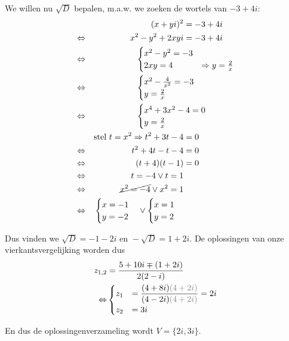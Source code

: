 \documentclass[12pt,twoside]{article}
\begin{document}
We willen nu $\sqrt{D}$ bepalen, m.a.w. we zoeken de wortels van $-3+4i$:
\begin{align*}
  &&(x+yi)^2 &= -3+4i\\
  \LRA &&x^2 - y^2 + 2xyi &= -3+4i\\
  \LRA && &\hspace*{-2cm}\begin{cases}x^2 - y^2 = -3\\2xy =  4 &\Rightarrow y=\frac{2}{x} \end{cases}\\
  \LRA && &\hspace*{-2cm}\begin{cases}x^2 - \frac{4}{x^2} = -3\\y =  \frac{2}{x}\end{cases}\\
  \LRA && &\hspace*{-2cm}\begin{cases}x^4+3x^2-4=0\\y =  \frac{2}{x}\end{cases}\\
  &&\mbox{stel } t=x^2
  \Rightarrow t^2+3t-4&=0\\
  \LRA && t^2+4t-t-4 &= 0\\
  \LRA && (t+4)(t-1) &= 0\\
  \LRA && t=-4 \vee t=1\\
  \LRA && \cancel{x^2=-4}\vee x^2=1\\
  \LRA && \begin{cases}x=-1\\y=-2\end{cases} \vee \begin{cases}x=1\\y=2\end{cases}
\end{align*}

Dus vinden we $\sqrt{D} = -1-2i \mbox{ en } -\sqrt{D}=1+2i$. De oplossingen van onze vierkantsvergelijking worden dus
\begin{align*}
  z_{1,2} &= \dfrac{5+10i \mp (1+2i)}{2(2-i)}\\
  \LRA & \begin{cases}z_1 &= \dfrac{(4+8i){\color{gray}(4+2i)}}{(4-2i){\color{gray}(4+2i)}}=2i\\z_2 &= 3i\end{cases}
\end{align*}

En dus de oplossingenverzameling wordt $V=\{2i, 3i\}$.
\end{document}
